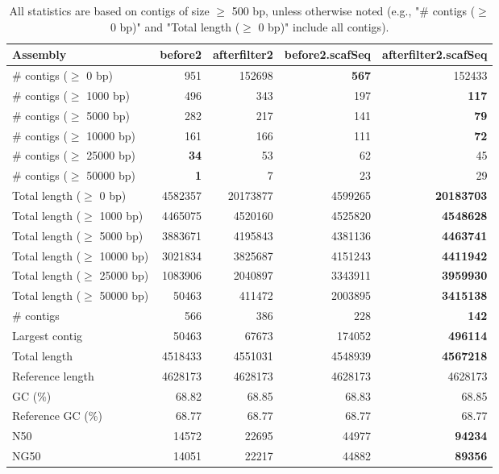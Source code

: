 \documentclass[12pt,a4paper]{article}
\begin{document}
\begin{table}[ht]
\begin{center}
\caption{All statistics are based on contigs of size $\geq$ 500 bp, unless otherwise noted (e.g., "\# contigs ($\geq$ 0 bp)" and "Total length ($\geq$ 0 bp)" include all contigs).}
\begin{tabular}{|l*{4}{|r}|}
\hline
Assembly & before2 & afterfilter2 & before2.scafSeq & afterfilter2.scafSeq \\ \hline
\# contigs ($\geq$ 0 bp) & 951 & 152698 & {\bf 567} & 152433 \\ \hline
\# contigs ($\geq$ 1000 bp) & 496 & 343 & 197 & {\bf 117} \\ \hline
\# contigs ($\geq$ 5000 bp) & 282 & 217 & 141 & {\bf 79} \\ \hline
\# contigs ($\geq$ 10000 bp) & 161 & 166 & 111 & {\bf 72} \\ \hline
\# contigs ($\geq$ 25000 bp) & {\bf 34} & 53 & 62 & 45 \\ \hline
\# contigs ($\geq$ 50000 bp) & {\bf 1} & 7 & 23 & 29 \\ \hline
Total length ($\geq$ 0 bp) & 4582357 & 20173877 & 4599265 & {\bf 20183703} \\ \hline
Total length ($\geq$ 1000 bp) & 4465075 & 4520160 & 4525820 & {\bf 4548628} \\ \hline
Total length ($\geq$ 5000 bp) & 3883671 & 4195843 & 4381136 & {\bf 4463741} \\ \hline
Total length ($\geq$ 10000 bp) & 3021834 & 3825687 & 4151243 & {\bf 4411942} \\ \hline
Total length ($\geq$ 25000 bp) & 1083906 & 2040897 & 3343911 & {\bf 3959930} \\ \hline
Total length ($\geq$ 50000 bp) & 50463 & 411472 & 2003895 & {\bf 3415138} \\ \hline
\# contigs & 566 & 386 & 228 & {\bf 142} \\ \hline
Largest contig & 50463 & 67673 & 174052 & {\bf 496114} \\ \hline
Total length & 4518433 & 4551031 & 4548939 & {\bf 4567218} \\ \hline
Reference length & 4628173 & 4628173 & 4628173 & 4628173 \\ \hline
GC (\%) & 68.82 & 68.85 & 68.83 & 68.85 \\ \hline
Reference GC (\%) & 68.77 & 68.77 & 68.77 & 68.77 \\ \hline
N50 & 14572 & 22695 & 44977 & {\bf 94234} \\ \hline
NG50 & 14051 & 22217 & 44882 & {\bf 89356} \\ \hline

\end{tabular}
\end{center}
\end{table}
\end{document}
